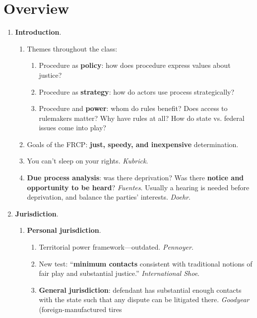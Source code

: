 \section{Overview}


\begin{enumerate}
    \item \textbf{Introduction}.
    \begin{enumerate}
        \item Themes throughout the class:
        \begin{enumerate}
            \item Procedure as \textbf{policy}: how does procedure express values 
            about justice?
            \item Procedure as \textbf{strategy}: how do actors use process 
            strategically?
            \item Procedure and \textbf{power}: whom do rules benefit? Does access 
            to rulemakers matter? Why have rules at all? How do state vs. federal 
            issues come into play?
        \end{enumerate}
        \item Goals of the FRCP: \textbf{just, speedy, and inexpensive} 
        determination.
        \item You can't sleep on your rights. \emph{Kubrick}.
        \item \textbf{Due process analysis}: was there deprivation? Was there 
        \textbf{notice and opportunity to be heard}? \emph{Fuentes}. Usually a 
        hearing is needed before deprivation, and balance the parties' 
        interests. \emph{Doehr}. 
    \end{enumerate}
    \item \textbf{Jurisdiction}.
    \begin{enumerate}
        \item \textbf{Personal jurisdiction}.
        \begin{enumerate}
            \item Territorial power framework---outdated. \emph{Pennoyer}.
            \item New test: ``\textbf{minimum contacts} consistent with 
            traditional notions of fair play and substantial justice.'' 
            \emph{International Shoe}.
            \item \textbf{General jurisdiction}: defendant has substantial 
            enough contacts with the state such that any dispute can be 
            litigated there. \emph{Goodyear} (foreign-manufactured tires 

\end{enumerate}
\end{enumerate}
\end{enumerate}
